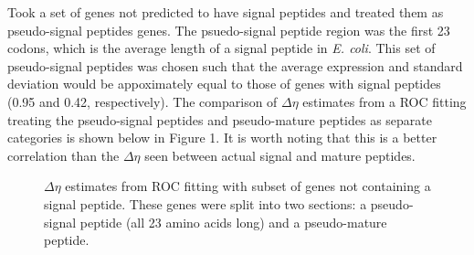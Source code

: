 \documentclass[11pt]{labbook}
\begin{document}
Took a set of genes not predicted to have signal peptides and treated them as pseudo-signal peptides genes. The psuedo-signal peptide region was the first 23 codons, which is the average length of a signal peptide in \textit{E. coli}. This set of pseudo-signal peptides was chosen such that the average expression and standard deviation would be appoximately equal to those of genes with signal peptides (0.95 and 0.42, respectively). The comparison of $\Delta\eta$ estimates from a ROC fitting treating the pseudo-signal peptides and pseudo-mature peptides as separate categories is shown below in Figure 1. It is worth noting that this is a better correlation than the $\Delta\eta$ seen between actual signal and mature peptides. \newline

\begin{figure}
\caption{$\Delta\eta$ estimates from ROC fitting with subset of genes not containing a signal peptide. These genes were split into two sections: a pseudo-signal peptide (all 23 amino acids long) and a pseudo-mature peptide. }
\end{figure}
\end{document}
